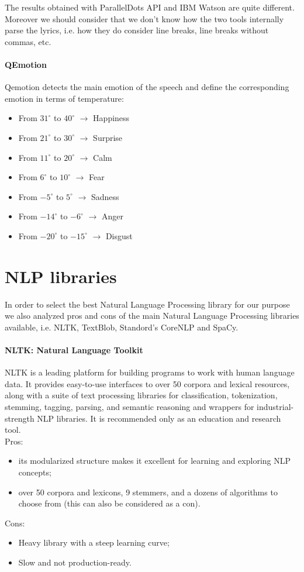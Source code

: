 The results obtained with ParallelDots API and IBM Watson are quite different. Moreover we should consider that we don't know how the two tools internally parse the lyrics, i.e. how they do consider line breaks, line breaks without commas, etc. 

\paragraph{QEmotion}\cite{qemotion}
Qemotion detects the main emotion of the speech and define the corresponding emotion in terms of temperature:
\begin{itemize}
\item From $31^{\circ}$ to $40^{\circ}$ $\to$ Happiness
\item From $21^{\circ}$ to $30^{\circ}$ $\to$ Surprise
\item From $11^{\circ}$ to $20^{\circ}$ $\to $ Calm
\item From $6^{\circ}$ to $10^{\circ}$ $\to $ Fear
\item From $-5^{\circ}$ to $5^{\circ}$ $\to $ Sadness
\item From $-14^{\circ}$ to $-6^{\circ}$ $\to $ Anger
\item From $-20^{\circ}$ to $-15^{\circ}$ $\to $ Disgust
\end{itemize}

\section{NLP libraries}
In order to select the best Natural Language Processing library for our purpose we also analyzed pros and cons of the main Natural Language Processing libraries available, i.e. NLTK, TextBlob, Standord's CoreNLP and SpaCy. 

\paragraph{NLTK: Natural Language Toolkit}
NLTK is a leading platform for building programs to work with human language data. It provides easy-to-use interfaces to over 50 corpora and lexical resources, along with a suite of text processing libraries for classification, tokenization, stemming, tagging, parsing, and semantic reasoning and wrappers for industrial-strength NLP libraries\cite{nltk}. It is recommended only as an education and research tool. \\
Pros:
\begin{itemize}
\item its modularized structure makes it excellent for learning and exploring NLP concepts; 
\item over 50 corpora and lexicons, 9 stemmers, and a dozens of algorithms to choose from (this can also be considered as a con).
\end{itemize}
Cons: 
\begin{itemize}
\item Heavy library with a steep learning curve;
\item Slow and not production-ready. 
\end{itemize}

